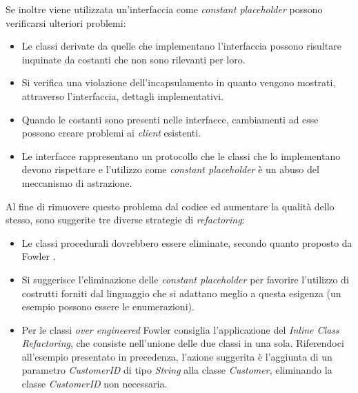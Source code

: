         Se inoltre viene utilizzata un'interfaccia come \textit{constant placeholder} possono verificarsi ulteriori problemi:
        \begin{itemize}
            \item Le classi derivate da quelle che implementano l'interfaccia possono risultare inquinate da costanti che non sono rilevanti per loro.
            
            \item Si verifica una violazione dell'incapsulamento in quanto vengono mostrati, attraverso l'interfaccia, dettagli implementativi.
            
            \item Quando le costanti sono presenti nelle interfacce, cambiamenti ad esse possono creare problemi ai \textit{client} esistenti.
            
            \item Le interfacce rappresentano un protocollo che le classi che lo implementano devono rispettare e l'utilizzo come \textit{constant placeholder} è un abuso del meccanismo di astrazione.
        \end{itemize}
        
        Al fine di rimuovere questo problema dal codice ed aumentare la qualità dello stesso, sono suggerite tre diverse strategie \cite{SURYANARAYANA201521} di \textit{refactoring}:
        \begin{itemize}
            \item Le classi procedurali dovrebbero essere eliminate, secondo quanto proposto da Fowler \cite{fowler2018refactoring}.
            
            \item Si suggerisce l'eliminazione delle \textit{constant placeholder} per favorire l'utilizzo di costrutti forniti dal linguaggio che si adattano meglio a questa esigenza (un esempio possono essere le enumerazioni).
            
            \item Per le classi \textit{over engineered} Fowler consiglia \cite{fowler2018refactoring} l'applicazione del \textit{Inline Class Refactoring}, che consiste nell'unione delle due classi in una sola. Riferendoci all'esempio presentato in precedenza, l'azione suggerita è l'aggiunta di un parametro \textit{CustomerID} di tipo \textit{String} alla classe \textit{Customer}, eliminando la classe \textit{CustomerID} non necessaria.
        \end{itemize}
        
